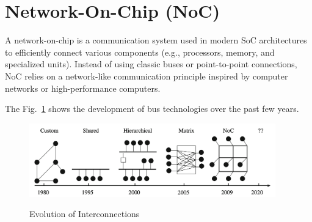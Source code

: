 \section{Network-On-Chip (NoC)}

A network-on-chip is a communication system used in modern \ac{SoC} architectures to efficiently connect various components (e.g., processors, memory, and specialized units). Instead of using classic buses or point-to-point connections, \ac{NoC} relies on a network-like communication principle inspired by computer networks or high-performance computers.\cite{serpanos_architecture_2011}

The Fig.~\ref{fig:Evolution_of_Interconnection} shows the development of bus technologies over the past few years.
\begin{figure}[htbp]
    \centering
    \includegraphics[width=0.95\textwidth]{img/Evolution of On-Chip communication interconnect.png}
    \caption{Evolution of Interconnections}\cite{abderazek_multicore_2013}\label{fig:Evolution_of_Interconnection}
\end{figure}

